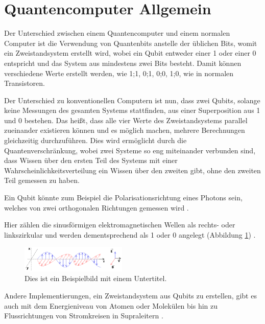 \section*{Quantencomputer Allgemein}

Der Unterschied zwischen einem Quantencomputer und einem normalen Computer ist die Verwendung von Quantenbits \cite{quantencomputer_2024} anstelle der üblichen Bits, womit ein Zweistandsystem \cite{zweizustandssystem_nodate} erstellt wird, wobei ein Qubit entweder einer 1 oder einer 0 entspricht und das System aus mindestens zwei Bits besteht. Damit können verschiedene Werte erstellt werden, wie 1;1, 0;1, 0;0, 1;0, wie in normalen Transistoren.

Der Unterschied zu konventionellen Computern ist nun, dass zwei Qubits, solange keine Messungen des gesamten Systems stattfinden, aus einer Superposition aus 1 und 0 bestehen. 
Das heißt, dass alle vier Werte des Zweistandsystems parallel zueinander existieren können und es möglich machen, mehrere Berechnungen gleichzeitig durchzuführen.\cite{What_is_quantum_computing_nodate}
Dies wird ermöglicht durch die Quantenverschränkung, wobei zwei Systeme so eng miteinander verbunden sind, dass Wissen über den ersten Teil des Systems mit einer Wahrscheinlichkeitsverteilung ein Wissen über den zweiten gibt, ohne den zweiten Teil gemessen zu haben.\cite{quantenverschrankung_2024}

Ein Qubit könnte zum Beispiel die Polarisationsrichtung eines Photons sein, welches von zwei orthogonalen Richtungen gemessen wird \cite{What_is_quantum_computing_nodate}. 

Hier zählen die sinusförmigen elektromagnetischen Wellen als rechts- 
oder linkszirkular und werden dementsprechend als 1 oder 0 angelegt (Abbildung \ref{fig:elektromagnetische_welle}) \cite{electromagnetic_2024}.

\begin{figure}[h]
    \centering
    \includegraphics[width=0.45\textwidth]{Onde_electromagnetique.svg.jpg}
    \caption{Dies ist ein Beispielbild mit einem Untertitel.}
    \label{fig:elektromagnetische_welle}
\end{figure}


Andere Implementierungen, ein Zweistandsystem aus Qubits zu erstellen, gibt es auch mit dem Energieniveau von Atomen oder Molekülen bis hin zu Flussrichtungen von Stromkreisen in Supraleitern \cite{supraleitung_nodate}.

